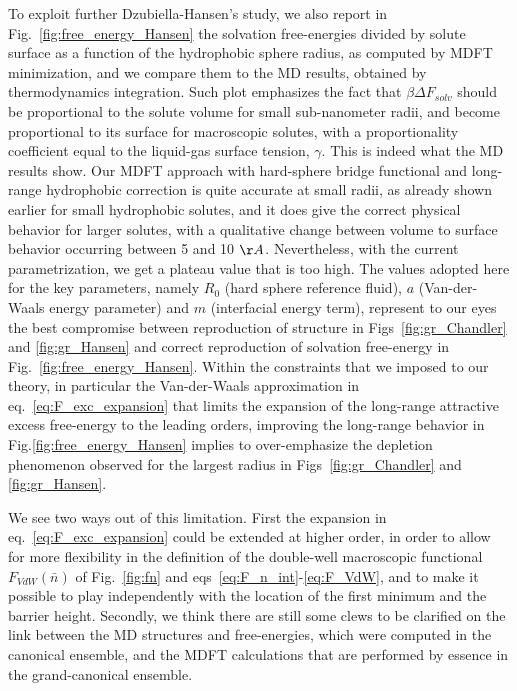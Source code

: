 \documentclass[aip,jcp,preprint]{revtex4-1}
\begin{document}
To exploit further Dzubiella-Hansen's study, we also report in Fig.~\ref{fig:free_energy_Hansen} the solvation free-energies divided by solute surface as a function of the hydrophobic sphere radius, as  computed by MDFT minimization, and  we compare them to the MD results, obtained by thermodynamics integration. Such plot emphasizes the fact that $\beta \Delta F_{solv}$ should be proportional to the solute volume for small sub-nanometer radii, and become proportional to its surface for macroscopic solutes, with a proportionality coefficient equal to the liquid-gas surface tension, $\gamma$. This is indeed what the MD results show. Our MDFT approach with hard-sphere bridge functional and long-range hydrophobic correction is quite accurate at small radii, as already shown earlier for small hydrophobic solutes, and it does give the correct physical behavior for larger solutes, with a qualitative change between volume to surface behavior occurring between 5 and 10 $\AA$. Nevertheless,  with the current parametrization, we get a plateau value that is too high. The values adopted here for the key parameters, namely  $R_0$ (hard sphere reference fluid), $a$ (Van-der-Waals energy parameter) and $m$ (interfacial energy term), represent to our eyes the best compromise between reproduction of structure in Figs~\ref{fig:gr_Chandler} and \ref{fig:gr_Hansen} and correct reproduction of solvation free-energy in Fig.~\ref{fig:free_energy_Hansen}. Within the constraints that we imposed to our theory, in particular the Van-der-Waals approximation in eq.~\ref{eq:F_exc_expansion} that limits the expansion of the long-range attractive excess free-energy to the leading orders, improving the long-range behavior in Fig.\ref{fig:free_energy_Hansen} implies to over-emphasize the depletion phenomenon observed for the largest radius in Figs~\ref{fig:gr_Chandler} and \ref{fig:gr_Hansen}.

We see two ways out of this limitation. First the expansion in eq.~\ref{eq:F_exc_expansion} could be extended at higher order, in order to allow for more flexibility in the  definition of the double-well macroscopic functional $F_{VdW}(\bar{n})$ of Fig.~\ref{fig:fn} and 
eqs~\ref{eq:F_n_int}-\ref{eq:F_VdW}, and to make it possible to play independently  with the location of the first minimum  and the barrier height. Secondly, we think there are still some clews to be clarified on the link between the MD  structures and free-energies, which were computed in the canonical ensemble, and the MDFT calculations that are performed by essence in the grand-canonical ensemble. 
\end{document}
